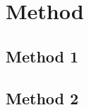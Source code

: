 %

\section{Method}\label{sec:2_2}
\subsection{Method 1}\label{subsec:2_2_1}

\lipsum[10]

\subsection{Method 2}\label{subsec:2_2_2}

\lipsum[10]
